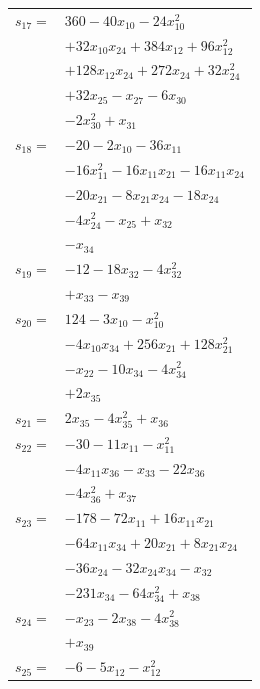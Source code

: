\begin{longtable}{@{}r@{\;}l@{}}
\(s_{17}=\) & \(\displaystyle 360 -40x_{10} -24x_{10}^{2}\) \\
 & \(\displaystyle +32x_{10}x_{24} +384x_{12} +96x_{12}^{2}\) \\
 & \(\displaystyle +128x_{12}x_{24} +272x_{24} +32x_{24}^{2}\) \\
 & \(\displaystyle +32x_{25} -x_{27} -6x_{30}\) \\
 & \(\displaystyle -2x_{30}^{2} +x_{31}\) \\[3pt]
\(s_{18}=\) & \(\displaystyle -20 -2x_{10} -36x_{11}\) \\
 & \(\displaystyle -16x_{11}^{2} -16x_{11}x_{21} -16x_{11}x_{24}\) \\
 & \(\displaystyle -20x_{21} -8x_{21}x_{24} -18x_{24}\) \\
 & \(\displaystyle -4x_{24}^{2} -x_{25} +x_{32}\) \\
 & \(\displaystyle -x_{34}\) \\[3pt]
\(s_{19}=\) & \(\displaystyle -12 -18x_{32} -4x_{32}^{2}\) \\
 & \(\displaystyle +x_{33} -x_{39}\) \\[3pt]
\(s_{20}=\) & \(\displaystyle 124 -3x_{10} -x_{10}^{2}\) \\
 & \(\displaystyle -4x_{10}x_{34} +256x_{21} +128x_{21}^{2}\) \\
 & \(\displaystyle -x_{22} -10x_{34} -4x_{34}^{2}\) \\
 & \(\displaystyle +2x_{35}\) \\[3pt]
\(s_{21}=\) & \(\displaystyle 2x_{35} -4x_{35}^{2} +x_{36}\) \\[3pt]
\(s_{22}=\) & \(\displaystyle -30 -11x_{11} -x_{11}^{2}\) \\
 & \(\displaystyle -4x_{11}x_{36} -x_{33} -22x_{36}\) \\
 & \(\displaystyle -4x_{36}^{2} +x_{37}\) \\[3pt]
\(s_{23}=\) & \(\displaystyle -178 -72x_{11} +16x_{11}x_{21}\) \\
 & \(\displaystyle -64x_{11}x_{34} +20x_{21} +8x_{21}x_{24}\) \\
 & \(\displaystyle -36x_{24} -32x_{24}x_{34} -x_{32}\) \\
 & \(\displaystyle -231x_{34} -64x_{34}^{2} +x_{38}\) \\[3pt]
\(s_{24}=\) & \(\displaystyle -x_{23} -2x_{38} -4x_{38}^{2}\) \\
 & \(\displaystyle +x_{39}\) \\[3pt]
\(s_{25}=\) & \(\displaystyle -6 -5x_{12} -x_{12}^{2}\) \\

\end{longtable}
